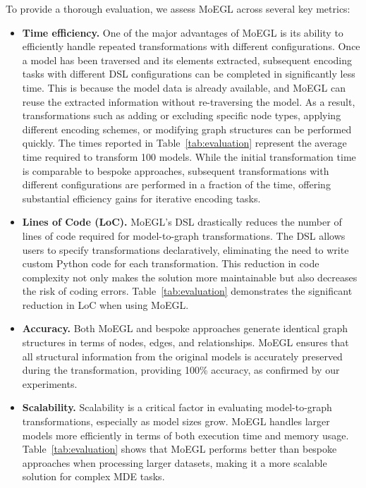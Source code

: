 \documentclass[journal,article,submit,moreauthors,technologies]{Definitions/mdpi}
\begin{document}
To provide a thorough evaluation, we assess MoEGL across several key metrics:

\begin{itemize}
    \item \textbf{Time efficiency.} One of the major advantages of MoEGL is its ability to efficiently handle repeated transformations with different configurations. Once a model has been traversed and its elements extracted, subsequent encoding tasks with different DSL configurations can be completed in significantly less time. This is because the model data is already available, and MoEGL can reuse the extracted information without re-traversing the model. As a result, transformations such as adding or excluding specific node types, applying different encoding schemes, or modifying graph structures can be performed quickly. The times reported in Table~\ref{tab:evaluation} represent the average time required to transform 100 models. While the initial transformation time is comparable to bespoke approaches, subsequent transformations with different configurations are performed in a fraction of the time, offering substantial efficiency gains for iterative encoding tasks.

    \item \textbf{Lines of Code (LoC).} MoEGL's DSL drastically reduces the number of lines of code required for model-to-graph transformations. The DSL allows users to specify transformations declaratively, eliminating the need to write custom Python code for each transformation. This reduction in code complexity not only makes the solution more maintainable but also decreases the risk of coding errors. Table~\ref{tab:evaluation} demonstrates the significant reduction in LoC when using MoEGL.

    \item \textbf{Accuracy.} Both MoEGL and bespoke approaches generate identical graph structures in terms of nodes, edges, and relationships. MoEGL ensures that all structural information from the original models is accurately preserved during the transformation, providing 100\% accuracy, as confirmed by our experiments.

    \item \textbf{Scalability.} Scalability is a critical factor in evaluating model-to-graph transformations, especially as model sizes grow. MoEGL handles larger models more efficiently in terms of both execution time and memory usage. Table~\ref{tab:evaluation} shows that MoEGL performs better than bespoke approaches when processing larger datasets, making it a more scalable solution for complex MDE tasks.


\end{itemize}
\end{document}
